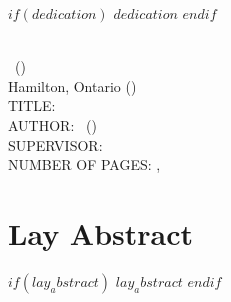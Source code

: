 \documentclass[
11pt, %
oneside, %
english, %
singlespacing, %
]{macthesis} %
\def\blankpage{%
      \clearpage%
      \thispagestyle{empty}%
      \addtocounter{page}{-1}%
      \null%
      \clearpage}
\begin{document}
\blankpage
\clearpage



$if(dedication)$
    $dedication$
$endif$

\blankpage
\clearpage


\newpage
{} %
\setcounter{page}{2} %

\noindent %
\univname \\
\degreename\, (\the\year) \\
Hamilton, Ontario (\deptname) \\[1.5cm]
TITLE: \ttitle \\
AUTHOR: \authorname\,  %
(\univname)  \\
SUPERVISOR: \supname\, \\
NUMBER OF PAGES: \pageref{lastoffront}, \pageref{LastPage}  %

\clearpage

\section*{Lay Abstract}
$if(lay_abstract)$
  $lay_abstract$
$endif$
\blankpage
\clearpage
\end{document}
